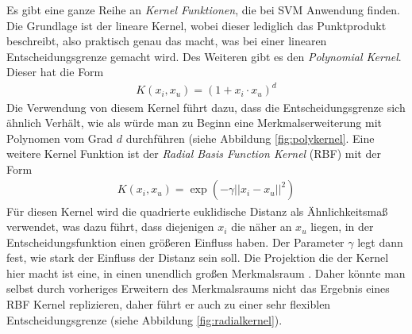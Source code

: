 \documentclass[
]{article}
\begin{document}
Es gibt eine ganze Reihe an \textit{Kernel Funktionen}, die bei SVM
Anwendung finden. Die Grundlage ist der lineare Kernel, wobei dieser
lediglich das Punktprodukt beschreibt, also praktisch genau das macht,
was bei einer linearen Entscheidungsgrenze gemacht wird. Des Weiteren
gibt es den \textit{Polynomial Kernel}. Dieser hat die Form
\begin{align}
 K(x_i,x_u)=(1+x_i\cdot x_u)^d
\end{align} Die Verwendung von diesem Kernel führt dazu, dass die
Entscheidungsgrenze sich ähnlich Verhält, wie als würde man zu Beginn
eine Merkmalserweiterung mit Polynomen vom Grad \(d\) durchführen (siehe
Abbildung \ref{fig:polykernel}. Eine weitere Kernel Funktion ist der
\textit{Radial Basis Function Kernel} (RBF) mit der Form \begin{align}
K(x_i,x_u)=\exp\left(-\gamma ||x_i-x_u||^2\right)
\end{align} Für diesen Kernel wird die quadrierte euklidische Distanz
als Ähnlichkeitsmaß verwendet, was dazu führt, dass diejenigen \(x_i\)
die näher an \(x_u\) liegen, in der Entscheidungsfunktion einen größeren
Einfluss haben. Der Parameter \(\gamma\) legt dann fest, wie stark der
Einfluss der Distanz sein soll. Die Projektion die der Kernel hier macht
ist eine, in einen unendlich großen Merkmalsraum
\parencite{jamesIntroductionStatisticalLearning2021}. Daher könnte man
selbst durch vorheriges Erweitern des Merkmalsraums nicht das Ergebnis
eines RBF Kernel replizieren, daher führt er auch zu einer sehr
flexiblen Entscheidungsgrenze (siehe Abbildung
\ref{fig:radialkernel}).\\
\end{document}
